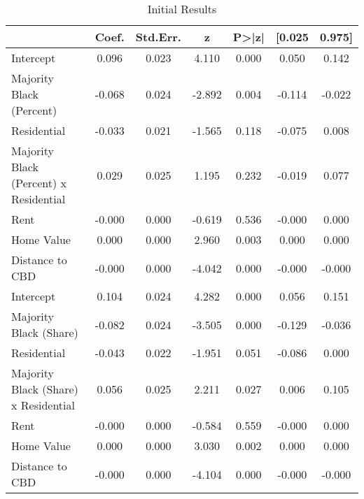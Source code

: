 \begin{table}[h]
\caption{Initial Results}
\label{tab:initial_results}
\begin{tabular}{lcccccc}
\toprule
 & Coef. & Std.Err. & z & P>|z| & [0.025 & 0.975] \\
\midrule
Intercept & 0.096 & 0.023 & 4.110 & 0.000 & 0.050 & 0.142 \\
Majority Black (Percent) & -0.068 & 0.024 & -2.892 & 0.004 & -0.114 & -0.022 \\
Residential & -0.033 & 0.021 & -1.565 & 0.118 & -0.075 & 0.008 \\
Majority Black (Percent) x Residential & 0.029 & 0.025 & 1.195 & 0.232 & -0.019 & 0.077 \\
Rent & -0.000 & 0.000 & -0.619 & 0.536 & -0.000 & 0.000 \\
Home Value & 0.000 & 0.000 & 2.960 & 0.003 & 0.000 & 0.000 \\
Distance to CBD & -0.000 & 0.000 & -4.042 & 0.000 & -0.000 & -0.000 \\
Intercept & 0.104 & 0.024 & 4.282 & 0.000 & 0.056 & 0.151 \\
Majority Black (Share) & -0.082 & 0.024 & -3.505 & 0.000 & -0.129 & -0.036 \\
Residential & -0.043 & 0.022 & -1.951 & 0.051 & -0.086 & 0.000 \\
Majority Black (Share) x Residential & 0.056 & 0.025 & 2.211 & 0.027 & 0.006 & 0.105 \\
Rent & -0.000 & 0.000 & -0.584 & 0.559 & -0.000 & 0.000 \\
Home Value & 0.000 & 0.000 & 3.030 & 0.002 & 0.000 & 0.000 \\
Distance to CBD & -0.000 & 0.000 & -4.104 & 0.000 & -0.000 & -0.000 \\
\bottomrule
\end{tabular}
\end{table}
